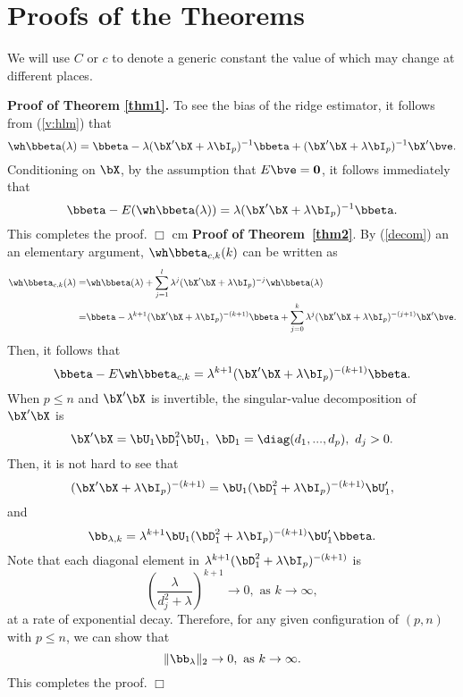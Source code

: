 {{	\setcounter{equation}{0}
	\renewcommand{\theequation}{\thesection.\arabic{equation}}
	
	
	
	
	\renewcommand{\theequation}{IA.\arabic{equation}}	\renewcommand{\thefigure}{IA.\arabic{figure}} \setcounter{figure}{0}
	\renewcommand{\thetable}{IA.\Roman{table}} \setcounter{table}{0}
	
	
	
	
	
	
	
	

\section{Proofs of the Theorems}

 We will use $C$ or $c$ to denote a generic constant the value of which may change at different places.
\vskip 0.5cm

 {\bf Proof of Theorem \ref{thm1}.} To see the bias of the ridge estimator, it follows from (\ref{v:hlm}) that
\begin{equation}\label{decom}
    \wh\bbeta(\lambda)=\bbeta-\lambda(\bX'\bX+\lambda\bI_p)^{-1}\bbeta+(\bX'\bX+\lambda\bI_p)^{-1}\bX'\bve.
\end{equation}
Conditioning on $\bX$, by the assumption that $E\bve={\bf 0}$, it follows immediately that
\[\bbeta-E(\wh\bbeta(\lambda))=\lambda(\bX'\bX+\lambda\bI_p)^{-1}\bbeta.\]
This completes the proof. $\Box$
 cm
{\bf Proof of Theorem~\ref{thm2}}. By (\ref{decom}) an an elementary argument, $\wh\bbeta_{c,k}(k)$ can be written as
\begin{align}\label{btck}
   \wh\bbeta_{c,k}(\lambda)=&\wh\bbeta(\lambda)+\sum_{j=1}^{l}\lambda^j(\bX'\bX+\lambda\bI_p)^{-j}\wh\bbeta(\lambda)\notag\\
   =&\bbeta-\lambda^{k+1}(\bX'\bX+\lambda\bI_p)^{-(k+1)}\bbeta+\sum_{j=0}^k\lambda^j(\bX'\bX+\lambda\bI_p)^{-(j+1)}\bX'\bve.
\end{align}
Then, it follows that
\[\bbeta-E\wh\bbeta_{c,k}=\lambda^{k+1}(\bX'\bX+\lambda\bI_p)^{-(k+1)}\bbeta.\]
When $p\leq n$ and $\bX'\bX$ is invertible, the singular-value decomposition of $\bX'\bX$ is
\[\bX'\bX=\bU_1\bD_1^2\bU_1,\,\,\bD_1=\diag(d_1,...,d_p),\,\, d_j>0.\]
Then, it is not hard to see that
\[(\bX'\bX+\lambda\bI_p)^{-(k+1)}=\bU_1(\bD_1^2+\lambda\bI_p)^{-(k+1)}\bU_1',\]
and
\[\bb_{\lambda,k}=\lambda^{k+1}\bU_1(\bD_1^2+\lambda\bI_p)^{-(k+1)}\bU_1'\bbeta.\]
Note that each diagonal element in $\lambda^{k+1}(\bD_1^2+\lambda\bI_p)^{-(k+1)}$ is
\[\left(\frac{\lambda}{d_j^2+\lambda}\right)^{k+1}\rightarrow 0,\,\, \text{as $k\rightarrow\infty$},\]
at a rate of exponential decay. Therefore, for any given configuration of $(p,n)$ with $p\leq n$, we can show that
\[\|\bb_{\lambda}\|_2\rightarrow 0,\,\,\text{as $k\rightarrow\infty$}.\]
This completes the proof. $\Box$
\vskip 0.5cm

}}
